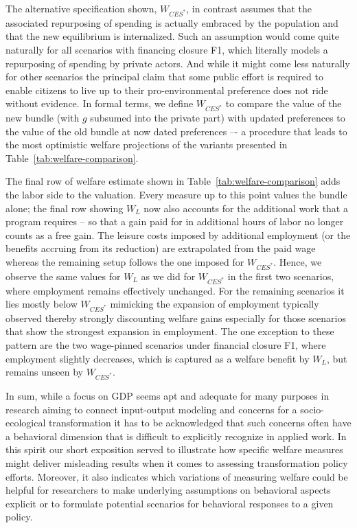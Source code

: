 The alternative specification shown, $W_{CES^*}$, in contrast assumes that the associated repurposing of spending is actually embraced by the population and that the new equilibrium is internalized. Such an assumption would come quite naturally for all scenarios with financing closure F1, which literally models a repurposing of spending by private actors. And while it might come less naturally for other scenarios the principal claim that some public effort is required to enable citizens to live up to their pro-environmental preference \citep{Wissen.2021,Braganza.2025} does not ride without evidence. In formal terms, we define $W_{CES^*}$ to compare the value of the new bundle (with $g$ subsumed into the private part) with updated preferences to the value of the old bundle at now dated preferences –- a procedure that leads to the most optimistic welfare projections of the variants presented in Table~\ref{tab:welfare-comparison}.



The final row of welfare estimate shown in Table~\ref{tab:welfare-comparison} adds the labor side to the valuation. Every measure up to this point values the bundle alone; the final row showing $W_L$ now also accounts for the additional work that a program requires -- so that a gain paid for in additional hours of labor no longer counts as a free gain. The leisure costs imposed by additional employment (or the benefits accruing from its reduction) are extrapolated from the paid wage whereas the remaining setup follows the one imposed for $W_{CES^*}$. Hence, we observe the same values for $W_L$ as we did for $W_{CES^*}$ in the first two scenarios, where employment remains effectively unchanged. For the remaining scenarios it lies mostly below $W_{CES^*}$ mimicking the expansion of employment typically observed thereby strongly discounting welfare gains especially for those scenarios that show the strongest expansion in employment. The one exception to these pattern are the two wage-pinned scenarios under financial closure F1, where employment slightly decreases, which is captured as a welfare benefit by $W_L$, but remains unseen by $W_{CES^*}$.

In sum, while a focus on GDP seems apt and adequate for many purposes in research aiming to connect input-output modeling and concerns for a socio-ecological transformation it has to be acknowledged that such concerns often have a behavioral dimension that is difficult to explicitly recognize in applied work. In this spirit our short exposition served to illustrate how specific welfare measures might deliver misleading results when it comes to assessing transformation policy efforts. Moreover, it also indicates which variations of measuring welfare could be helpful for researchers to make underlying assumptions on behavioral aspects explicit or to formulate potential scenarios for behavioral responses to a given policy.

